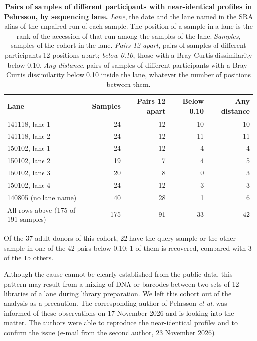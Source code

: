 \documentclass[11pt,a4paper]{article}
\begin{document}
\setcounter{table}{4}
\begin{table}[!htbp]\centering\small
\caption[Pairs of samples of different participants with near-identical profiles in Pehrsson, by sequencing lane]{\textbf{Pairs of samples of different participants with near-identical profiles in Pehrsson, by sequencing lane.} \textit{Lane}, the date and the lane named in the SRA alias of the unpaired run of each sample. The position of a sample in a lane is the rank of the accession of that run among the samples of the lane. \textit{Samples}, samples of the cohort in the lane. \textit{Pairs 12 apart}, pairs of samples of different participants 12 positions apart; \textit{below 0.10}, those with a Bray-Curtis dissimilarity below 0.10. \textit{Any distance}, pairs of samples of different participants with a Bray-Curtis dissimilarity below 0.10 inside the lane, whatever the number of positions between them.}
\begin{tabular}{lrrrr}
\toprule
Lane & Samples & Pairs 12 apart & Below 0.10 & Any distance \\
\midrule
141118, lane 1 & 24 & 12 & 10 & 10 \\
141118, lane 2 & 24 & 12 & 11 & 11 \\
150102, lane 1 & 24 & 12 & 4 & 4 \\
150102, lane 2 & 19 & 7 & 4 & 5 \\
150102, lane 3 & 20 & 8 & 0 & 3 \\
150102, lane 4 & 24 & 12 & 3 & 3 \\
140805 (no lane name) & 40 & 28 & 1 & 6 \\
\midrule
All rows above (175 of 191 samples) & 175 & 91 & 33 & 42 \\
\bottomrule
\end{tabular}
\end{table}

Of the 37 adult donors of this cohort, 22 have the query sample or the other sample in one of the 42 pairs below 0.10; 1 of them is recovered, compared with 3 of the 15 others.

Although the cause cannot be clearly established from the public data, this pattern may result from a mixing of DNA or barcodes between two sets of 12 libraries of a lane during library preparation. We left this cohort out of the analysis as a precaution. The corresponding author of Pehrsson \textit{et al.} was informed of these observations on 17 November 2026 and is looking into the matter. The authors were able to reproduce the near-identical profiles and to confirm the issue (e-mail from the second author, 23 November 2026).
\end{document}
